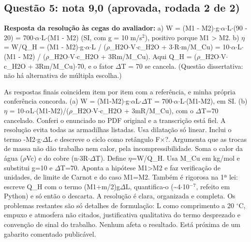 \documentclass{article}%
\begin{document}
\subsection*{Questão 5: nota 9,0 (aprovada, rodada 2 de 2)}%
\textbf{Resposta da resolução às cegas do avaliador:} a) W = (M1 - M2)$\cdot$g$\cdot$$\alpha$$\cdot$L$\cdot$(90 - 20) = 700$\cdot$$\alpha$$\cdot$L$\cdot$(M1 - M2) (SI, com g = 10 m/s$^2$), positivo porque M1 > M2.\newline%
\newline%
b) $\eta$ = W/Q\_H = (M1 - M2)$\cdot$g$\cdot$$\alpha$$\cdot$L / ($\rho$\_H2O$\cdot$V$\cdot$c\_H2O + 3$\cdot$R$\cdot$m/M\_Cu) = 10$\cdot$$\alpha$$\cdot$L$\cdot$(M1 - M2) / ($\rho$\_H2O$\cdot$V$\cdot$c\_H2O + 3Rm/M\_Cu). Aqui Q\_H = ($\rho$\_H2O$\cdot$V$\cdot$c\_H2O + 3Rm/M\_Cu)$\cdot$70, e o fator $\Delta$T = 70 se cancela.\newline%
\newline%
(Questão dissertativa: não há alternativa de múltipla escolha.)\par %
As respostas finais coincidem item por item com a referência, e minha própria conferência concorda. (a) W = (M1-M2)$\cdot$g$\cdot$$\alpha$L$\cdot$$\Delta$T = 700$\cdot$$\alpha$$\cdot$L$\cdot$(M1-M2), em SI. (b) $\eta$ = 10$\cdot$$\alpha$L$\cdot$(M1-M2)/($\rho$\_H2O$\cdot$V$\cdot$c\_H2O + 3mR/M\_Cu), com o $\Delta$T=70 cancelado. Conferi o enunciado no PDF original e a transcrição está fiel. A resolução evita todas as armadilhas listadas. Usa dilatação só linear. Inclui o termo -M2$\cdot$g$\cdot$$\Delta$L e descreve o ciclo como retângulo F$\times$?. Argumenta que as trocas de massa não dão trabalho nem calor, pela incompressibilidade. Soma o calor da água ($\rho$Vc) e do cobre (n$\cdot$3R$\cdot$$\Delta$T). Define $\eta$=W/Q\_H. Usa M\_Cu em kg/mol e substitui g=10 e $\Delta$T=70. Aponta a hipótese M1>M2 e faz verificação de unidades, de limite de Carnot e do caso M1=M2. Também é rigorosa na 1ª lei: escreve Q\_H com o termo (M1+m/2)g$\Delta$L, quantifica{-}o (\textasciitilde{}4$\cdot$10$^{-}$$^{7}$, refeito em Python) e só então o descarta. A resolução é clara, organizada e completa. Os problemas restantes são só detalhes de formulação: L como comprimento a 20 $^\circ$C, empuxo e atmosfera não citados, justificativa qualitativa do termo desprezado e convenção de sinal do trabalho. Nenhum afeta o resultado. Está próxima de um gabarito comentado publicável.%
\end{document}
